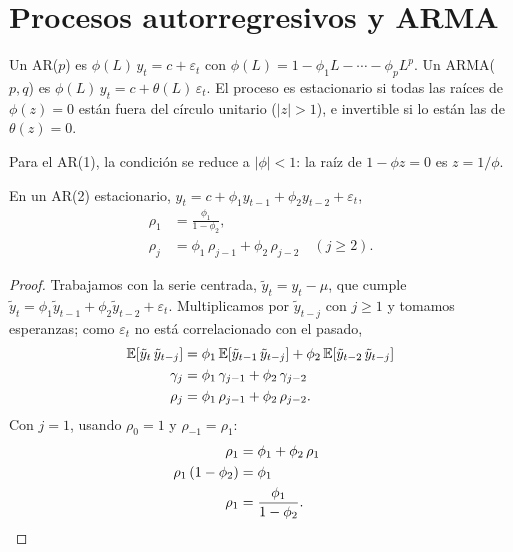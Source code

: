 \section{Procesos autorregresivos y ARMA}

\begin{definicion}[AR($p$) y ARMA($p,q$)]
Un AR($p$) es $\phi(L)\,y_t=c+\varepsilon_t$ con $\phi(L)=1-\phi_1L-\cdots-\phi_pL^p$. Un ARMA($p,q$) es
$\phi(L)\,y_t=c+\theta(L)\,\varepsilon_t$. El proceso es estacionario si todas las raíces de $\phi(z)=0$ están
fuera del círculo unitario ($|z|>1$), e invertible si lo están las de $\theta(z)=0$.
\end{definicion}

Para el AR(1), la condición se reduce a $|\phi|<1$: la raíz de $1-\phi z=0$ es $z=1/\phi$.

\begin{proposicion}\label{prop:ar2}
En un AR(2) estacionario, $y_t=c+\phi_1y_{t-1}+\phi_2y_{t-2}+\varepsilon_t$,
\begin{align*}
  \rho_1 &= \frac{\phi_1}{1-\phi_2},\\
  \rho_j &= \phi_1\,\rho_{j-1}+\phi_2\,\rho_{j-2} \quad (j\ge2).
\end{align*}
\end{proposicion}

\begin{proof}
Trabajamos con la serie centrada, $\tilde y_t=y_t-\mu$, que cumple
$\tilde y_t=\phi_1\tilde y_{t-1}+\phi_2\tilde y_{t-2}+\varepsilon_t$. Multiplicamos por $\tilde y_{t-j}$ con
$j\ge1$ y tomamos esperanzas; como $\varepsilon_t$ no está correlacionado con el pasado,
\begin{align*}
  \mathbb{E}[\tilde y_t\,\tilde y_{t-j}] &= \phi_1\,\mathbb{E}[\tilde y_{t-1}\,\tilde y_{t-j}]+\phi_2\,\mathbb{E}[\tilde y_{t-2}\,\tilde y_{t-j}]\\
  \gamma_j                       &= \phi_1\,\gamma_{j-1}+\phi_2\,\gamma_{j-2}\\
  \rho_j                         &= \phi_1\,\rho_{j-1}+\phi_2\,\rho_{j-2}.
\end{align*}
Con $j=1$, usando $\rho_0=1$ y $\rho_{-1}=\rho_1$:
\begin{align*}
  \rho_1               &= \phi_1+\phi_2\,\rho_1\\
  \rho_1\,(1-\phi_2)   &= \phi_1\\
  \rho_1               &= \frac{\phi_1}{1-\phi_2}. && \qedhere
\end{align*}
\end{proof}

